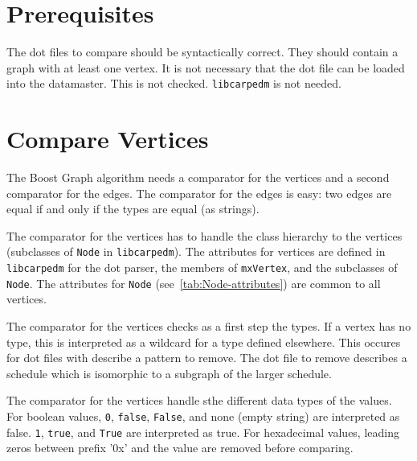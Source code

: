 \documentclass[12pt,a4paper]{report}
\begin{document}
\section{Prerequisites}
The dot files to compare should be syntactically correct.
They should contain a graph with at least one vertex.
It is not necessary that the dot file can be loaded into the datamaster. This is not checked.
\texttt{libcarpedm} is not needed.

\section{Compare Vertices}
The Boost Graph algorithm needs a comparator for the vertices and a second comparator for the edges.
The comparator for the edges is easy: two edges are equal if and only if the types are equal (as strings).

The comparator for the vertices has to handle the class hierarchy to the vertices (subclasses of \texttt{Node} in \texttt{libcarpedm}).
The attributes for vertices are defined in \texttt{libcarpedm} for the dot parser, the members of \texttt{mxVertex}, and the subclasses of \texttt{Node}.
The attributes for \texttt{Node} (see~\ref{tab:Node-attributes}) are common to all vertices.

The comparator for the vertices checks as a first step the types. If a vertex has no type, this is interpreted as a wildcard for a type defined elsewhere.
This occures for dot files with describe a pattern to remove. The dot file to remove describes a schedule which is isomorphic to a subgraph of the larger schedule.

The comparator for the vertices handle sthe different data types of the values. For boolean values, \texttt{0}, \texttt{false}, \texttt{False}, and none (empty string) are interpreted as false.
\texttt{1}, \texttt{true}, and \texttt{True} are interpreted as true. For hexadecimal values, leading zeros between prefix '0x' and the value are removed before comparing.
\end{document}
